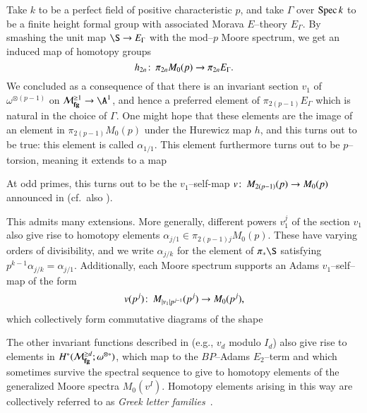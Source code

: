 \begin{example}
Take $k$ to be a perfect field of positive characteristic $p$, and take $\Gamma$ over $\operatorname{Spec} k$ to be a finite height formal group with associated Morava $E$--theory $E_\Gamma$.  By smashing the unit map $\S \to E_\Gamma$ with the mod--$p$ Moore spectrum, we get an induced map of homotopy groups \[h_{2n}\colon\thinspace \pi_{2n} M_0(p) \to \pi_{2n} E_\Gamma.\]  We concluded as a consequence of  that there is an invariant section $v_1$ of $\omega^{\otimes(p-1)}$ on $\moduli{fg}^{\ge 1} \to \A^1$, and hence a preferred element of $\pi_{2(p-1)} E_\Gamma$ which is natural in the choice of $\Gamma$.  One might hope that these elements are the image of an element in $\pi_{2(p-1)} M_0(p)$ under the Hurewicz map $h$, and this turns out to be true: this element is called $\alpha_{1/1}$.  This element furthermore turns out to be $p$--torsion, meaning it extends to a map
\begin{center}
\end{center}
At odd primes, this turns out to be the $v_1$--self-map $v\colon\thinspace M_{2(p-1)}(p) \to M_0(p)$ announced in  (cf.\ also \cite[Proposition 12.7]{AdamsJXIV}).

This admits many extensions.  More generally, different powers $v_1^j$ of the section $v_1$ also give rise to homotopy elements $\alpha_{j/1} \in \pi_{2(p-1)j} M_0(p)$.  These have varying orders of divisibility, and we write $\alpha_{j/k}$ for the element of $\pi_* \S$ satisfying $p^{k-1} \alpha_{j/k} = \alpha_{j/1}$.  Additionally, each Moore spectrum supports an Adams $v_1$--self--map of the form \[v(p^j) \colon\thinspace M_{|v_1| p^{j-1}}(p^j) \to M_0(p^j),\] which collectively form commutative diagrams of the shape
\begin{center}
\end{center}
The other invariant functions described in  (e.g., $v_d$ modulo $I_d$) also give rise to elements in $H^*(\mathcal{M}_{\mathbf{fg}}^{\ge d}; \omega^{\otimes *})$, which map to the $BP$--Adams $E_2$--term and which sometimes survive the spectral sequence to give to homotopy elements of the generalized Moore spectra $M_0(v^I)$.  Homotopy elements arising in this way are collectively referred to as \textit{Greek letter families}~\cite[Section 3]{MRW}.
\end{example}

